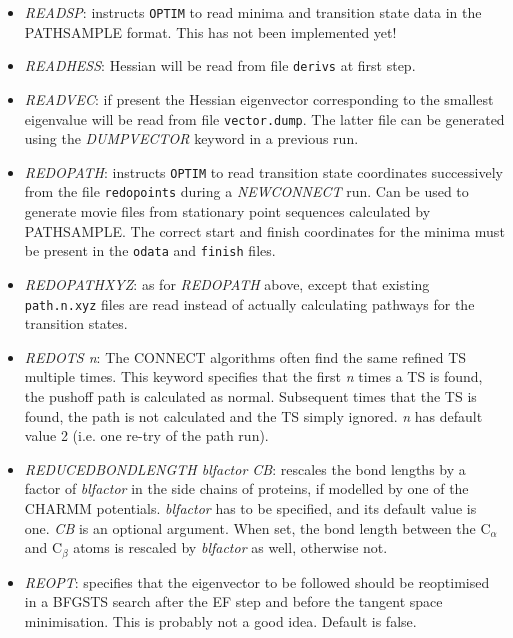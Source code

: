 \documentclass[12pt,a4paper,dvips]{article}
\begin{document}
\begin{itemize}
\item {\it READSP\/}: instructs {\tt OPTIM} to read minima and 
transition state data in the PATHSAMPLE format.
This has not been implemented yet!

\item {\it READHESS\/}: Hessian will be read from file {\tt derivs} at first step.

\item {\it READVEC\/}: if present the Hessian eigenvector
corresponding to the smallest eigenvalue 
will be read from file {\tt vector.dump}. The latter file can be generated using the
{\it DUMPVECTOR\/} keyword in a previous run.

\item {\it REDOPATH\/}: instructs {\tt OPTIM} to read transition state coordinates
successively from the file {\tt redopoints} during a {\it NEWCONNECT\/} run.
Can be used to generate movie files from stationary point sequences calculated
by PATHSAMPLE. The correct start and finish coordinates for the minima
must be present in the {\tt odata} and {\tt finish} files.

\item {\it REDOPATHXYZ\/}: as for {\it REDOPATH\/} above, except that existing
{\tt path.n.xyz\/} files are read instead of actually calculating pathways for the
transition states.

\item {\it REDOTS n\/}: The CONNECT algorithms often find the same refined TS multiple times. This keyword specifies that the first {\it n } times a TS is found, the pushoff path is calculated as normal. Subsequent times that the TS is found, the path is not calculated and the TS simply ignored. { \it n } has default value 2 (i.e. one re-try of the path run).

\item {\it REDUCEDBONDLENGTH blfactor CB\/}: rescales the bond lengths by a factor
of {\it blfactor} in the side chains of proteins, if modelled by one of the CHARMM
potentials. {\it blfactor} has to be specified, and its default value is one.
{\it CB} is an optional argument. When set, the bond length between the C$_{\alpha}$
and C$_{\beta}$ atoms is rescaled by {\it blfactor} as well, otherwise not.

\item {\it REOPT\/}: specifies that the eigenvector to be followed should be reoptimised
      in a BFGSTS search after the EF step and before the tangent space minimisation.
This is probably not a good idea. Default is false.


\end{itemize}
\end{document}
